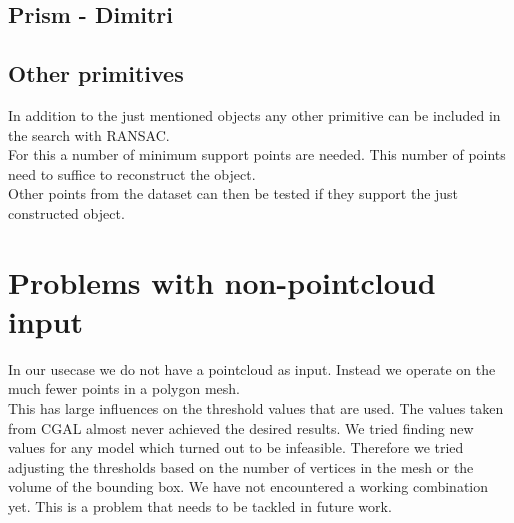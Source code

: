 \documentclass[../ClassicThesis.tex]{subfiles}
\begin{document}
\subsection{Prism - Dimitri}
\subsection{Other primitives}
In addition to the just mentioned objects any other primitive can be included in the search with RANSAC. \\
For this a number of minimum support points are needed. This number of points need to suffice to reconstruct the object. \\
Other points from the dataset can then be tested if they support the just constructed object. 
\section{Problems with non-pointcloud input}
In our usecase we do not have a pointcloud as input. Instead we operate on the much fewer points in a polygon mesh.\\
This has large influences on the threshold values that are used. The values taken from CGAL almost never achieved the desired results. We tried finding new values for any model which turned out to be infeasible. Therefore we tried adjusting the thresholds based on the number of vertices in the mesh or the volume of the bounding box. We have not encountered a working combination yet. This is a problem that needs to be tackled in future work.
\end{document}
